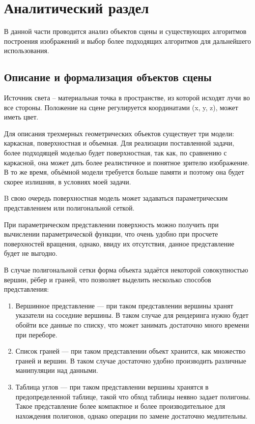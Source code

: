 \chapter{Аналитический раздел}

В данной части проводится анализ объектов сцены и существующих алгоритмов построения изображений и выбор более подходящих алгоритмов для дальнейшего использования.

\section{Описание и формализация объектов сцены}

Источник света – материальная точка в пространстве, из которой исходят лучи во все стороны. Положение на сцене регулируется координатами (x, y, z), может иметь цвет.

Для описания трехмерных геометрических объектов существует три модели: каркасная, поверхностная и объемная. Для реализации поставленной задачи, более подходящей моделью будет поверхностная, так как, по сравнению с каркасной, она может дать более реалистичное и понятное зрителю изображение. В то же время, объёмной модели требуется больше памяти и поэтому она будет скорее излишняя, в условиях моей задачи.

B свою очередь поверхностная модель может задаваться параметрическим представлением или полигональной сеткой.

При параметрическом представлении поверхность можно получить при вычислении параметрической функции, что очень удобно при просчете поверхностей вращения, однако, ввиду их отсутствия, данное представление будет не выгодно.

В случае полигональной сетки форма объекта задаётся некоторой совокупностью вершин, рёбер и граней, что позволяет выделить несколько способов представления:

\begin{enumerate}[label=\arabic*)]
	\item Вершинное представление --- при таком представлении вершины хранят указатели на соседние вершины. В таком случае для рендеринга нужно будет обойти все данные по списку, что может занимать достаточно много времени при переборе.
	\item Список граней --- при таком представлении объект хранится, как множество граней и вершин. В таком случае достаточно удобно производить различные манипуляции над данными.
	\item Таблица углов --- при таком представлении вершины хранятся в предопределенной таблице, такой что обход таблицы неявно задает полигоны. Такое представление более компактное и более производительное для нахождения полигонов, однако операции по замене достаточно медлительны.
\end{enumerate}

